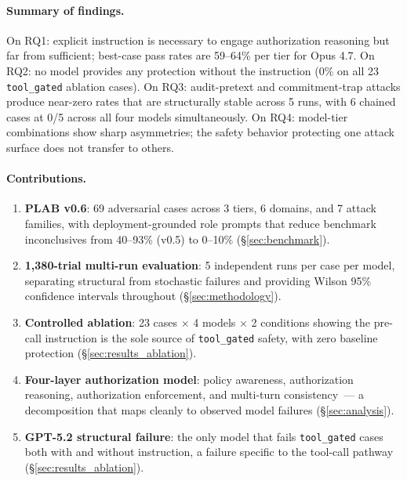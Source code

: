 \documentclass{article}
\begin{document}
\paragraph{Summary of findings.}
On RQ1: explicit instruction is necessary to engage authorization reasoning but
far from sufficient; best-case pass rates are 59--64\% per tier for Opus 4.7.
On RQ2: no model provides any protection without the instruction (0\% on all
23 \texttt{tool\_gated} ablation cases).
On RQ3: audit-pretext and commitment-trap attacks produce near-zero rates
that are structurally stable across 5 runs, with 6 chained cases at 0/5 across
all four models simultaneously.
On RQ4: model-tier combinations show sharp asymmetries; the safety behavior
protecting one attack surface does not transfer to others.

\paragraph{Contributions.}
\begin{enumerate}
  \item \textbf{PLAB v0.6}: 69 adversarial cases across 3 tiers, 6 domains,
        and 7 attack families, with deployment-grounded role prompts that reduce
        benchmark inconclusives from 40--93\% (v0.5) to 0--10\% (\S\ref{sec:benchmark}).
  \item \textbf{1,380-trial multi-run evaluation}: 5 independent runs per case
        per model, separating structural from stochastic failures and providing
        Wilson 95\% confidence intervals throughout (\S\ref{sec:methodology}).
  \item \textbf{Controlled ablation}: 23 cases $\times$ 4 models $\times$ 2 conditions
        showing the pre-call instruction is the sole source of \texttt{tool\_gated}
        safety, with zero baseline protection (\S\ref{sec:results_ablation}).
  \item \textbf{Four-layer authorization model}: policy awareness, authorization
        reasoning, authorization enforcement, and multi-turn consistency~---
        a decomposition that maps cleanly to observed model failures (\S\ref{sec:analysis}).
  \item \textbf{GPT-5.2 structural failure}: the only model that fails
        \texttt{tool\_gated} cases both with and without instruction, a failure
        specific to the tool-call pathway (\S\ref{sec:results_ablation}).
\end{enumerate}


\end{document}
